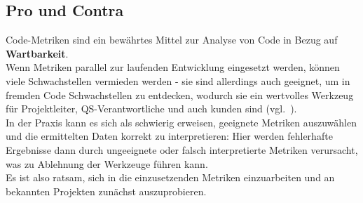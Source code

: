 \subsection*{Pro und Contra}
Code-Metriken sind ein bewährtes Mittel zur Analyse von Code in Bezug auf \textbf{Wartbarkeit}.\\
Wenn Metriken parallel zur laufenden Entwicklung eingesetzt werden, können viele Schwachstellen vermieden werden - sie sind allerdings auch geeignet, um in fremden Code Schwachstellen zu entdecken, wodurch sie ein wertvolles Werkzeug für Projektleiter, QS-Verantwortliche und auch kunden sind (vgl.~\cite[39]{Wed09c}).\\
In der Praxis kann es sich als schwierig erweisen, geeignete Metriken auszuwählen und die ermittelten Daten korrekt zu interpretieren: Hier werden fehlerhafte Ergebnisse dann durch ungeeignete oder falsch interpretierte Metriken verursacht, was zu Ablehnung der Werkzeuge führen kann.\\
Es ist also ratsam, sich in die einzusetzenden Metriken einzuarbeiten und an bekannten Projekten zunächst auszuprobieren.
